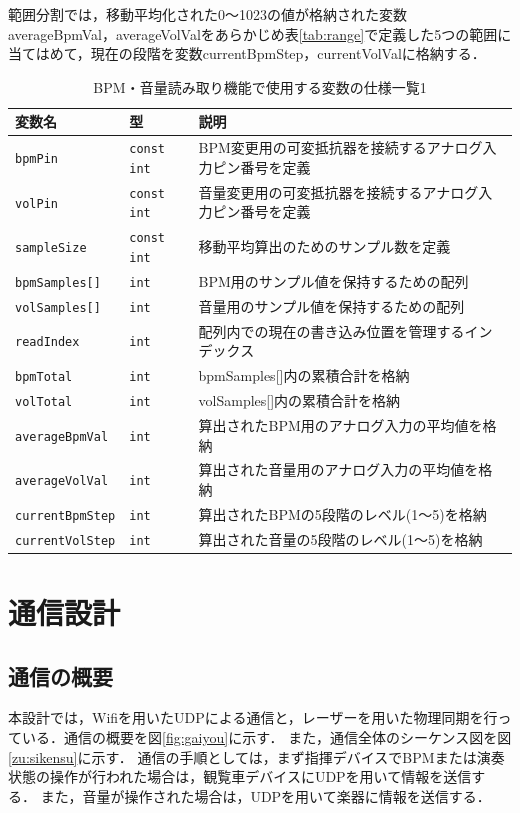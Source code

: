 \documentclass[lualatex,book,paper=a4paper,jafontsize=11.5pt,jafontscale=1.05]{jlreq}
\begin{document}
範囲分割では，移動平均化された0〜1023の値が格納された変数averageBpmVal，averageVolValをあらかじめ表\ref{tab:range}で定義した5つの範囲に当てはめて，現在の段階を変数currentBpmStep，currentVolValに格納する．

\begin{table}[H]
  \centering
  \caption{BPM・音量読み取り機能で使用する変数の仕様一覧1}
  \label{tab:bpmvol1}
  \begin{tabular}{llp{6cm}} \hline
    \textbf{変数名} & \textbf{型} & \textbf{説明} \\ \hline
	  \texttt{bpmPin} & \texttt{const int} & BPM変更用の可変抵抗器を接続するアナログ入力ピン番号を定義 \\\hline
	  \texttt{volPin} & \texttt{const int} & 音量変更用の可変抵抗器を接続するアナログ入力ピン番号を定義 \\\hline
    \texttt{sampleSize} & \texttt{const int}  & 移動平均算出のためのサンプル数を定義 \\\hline
	  \texttt{bpmSamples[]} & \texttt{int}  & BPM用のサンプル値を保持するための配列 \\\hline
	  \texttt{volSamples[]} & \texttt{int}  & 音量用のサンプル値を保持するための配列 \\\hline
	  \texttt{readIndex} & \texttt{int}  & 配列内での現在の書き込み位置を管理するインデックス \\\hline
	  \texttt{bpmTotal} & \texttt{int}  & bpmSamples[]内の累積合計を格納 \\ \hline
	  \texttt{volTotal} & \texttt{int}  & volSamples[]内の累積合計を格納 \\ \hline
    \texttt{averageBpmVal} & \texttt{int}  & 算出されたBPM用のアナログ入力の平均値を格納\\ \hline
    \texttt{averageVolVal} & \texttt{int}  & 算出された音量用のアナログ入力の平均値を格納 \\ \hline
	  \texttt{currentBpmStep} & \texttt{int}  & 算出されたBPMの5段階のレベル(1〜5)を格納\\ \hline
	  \texttt{currentVolStep} & \texttt{int}  & 算出された音量の5段階のレベル(1〜5)を格納 \\ \hline
    \end{tabular}
\end{table}



\section{通信設計}
\subsection{通信の概要}
本設計では，Wifiを用いたUDPによる通信と，レーザーを用いた物理同期を行っている．通信の概要を図\ref{fig:gaiyou}に示す．
また，通信全体のシーケンス図を図\ref{zu:sikensu}に示す．
通信の手順としては，まず指揮デバイスでBPMまたは演奏状態の操作が行われた場合は，観覧車デバイスにUDPを用いて情報を送信する．
また，音量が操作された場合は，UDPを用いて楽器に情報を送信する．
\end{document}
